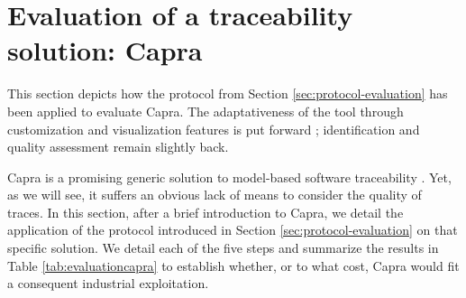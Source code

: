\section{Evaluation of a traceability solution: Capra}\label{sec:evaluationcapra}
This section depicts how the protocol from Section \ref{sec:protocol-evaluation} has been applied to evaluate Capra. The adaptativeness of the tool through customization and visualization features is put forward ; identification and quality assessment remain slightly back.
\sideboxend



Capra is a promising generic solution to model-based software traceability \cite{heisig2019-generic-traceability-metamodel-end-to-end-capra,maro2016_maintenance_factors_and_guidelines}. Yet, as we will see, it suffers an obvious lack of means to consider the quality of traces.
In this section, after a brief introduction to Capra, we detail the application of the protocol introduced in Section \ref{sec:protocol-evaluation} on that specific solution. We detail each of the five steps and summarize the results in Table \ref{tab:evaluationcapra} to establish whether, or to what cost, Capra would fit a consequent industrial exploitation.

